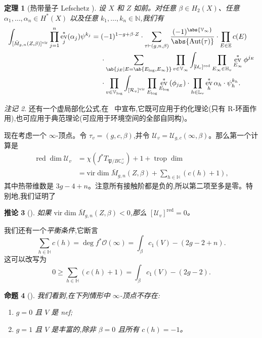 \documentclass{amsart}
\newtheorem{thm}{定理}[section]
\newtheorem{cor}[thm]{推论}
\newtheorem{prop}[thm]{命题}
\theoremstyle{definition}
\theoremstyle{remark}
\newtheorem{rmk}[thm]{注记}
\theoremstyle{plain}
\theoremstyle{definition}
\theoremstyle{remark}
\newcommand{\N}{\mathbb{N}}
\newcommand{\C}{\mathbb{C}}
\newcommand{\E}{\mathbb{E}}
\newcommand{\V}{\mathbb{V}}
\renewcommand{\H}{\mathbb{H}}
\renewcommand{\L}{\mathbb{L}}
\newcommand{\mc}[1]{\mathcal{#1}}
\newcommand{\mf}[1]{\mathfrak{#1}}
\newcommand{\mr}[1]{\mathrm{#1}}
\newcommand{\on}[1]{\operatorname{#1}}
\newcommand{\1}{\mathbf{1}}
\newcommand{\2}{\mathbf{2}}
\newcommand{\3}{\mathbf{3}}
\newcommand{\vir}{\mr{vir}}
\DeclareMathOperator{\Aut}{Aut}
\DeclareMathOperator{\ev}{ev}
\begin{document}
\begin{thm}[热带量子 Lefschetz {\cite{CJRtropical2025}}]
    设 \(X\) 和 \(Z\) 如前。对任意 \(\beta \in H_2(X)\)、任意 \(\alpha_1, \ldots, \alpha_n \in H^*(X)\) 以及任意 \(k_1, \ldots, k_n \in \N\),我们有
    \begin{align*}
        \int_{[\bar{M}_{g,n}(Z,\beta)]^{\vir}} \prod_{j=1}^n \ev_j^* (\alpha_j) \psi^{k_j}={}& (-1)^{1-g+\beta \cdot Z} \cdot \sum_{\tau \vdash (g,n,\beta)} \frac{(-1)^{\abs{\V_{\infty}}}}{\abs{\Aut(\tau)}} \cdot \prod_{E \in \E} c(E) \\
        & \cdot \sum_{\ab\{j_E \mid E = \ab\{E_{\log}, E_{\infty}\}\}}  \prod_{v \in \V_{\infty}} \int_{[\mc{U}_v]^{\on{red}}} \prod_{E_{\infty} \in \H_v} \ev_{E_{\infty}}^* \phi^{j_E}  \\
        &  \cdot \prod_{v \in \V_{\log}} \int_{[\mc{R}_v]^{\vir}} \prod_{E_{\log}} \ev_{E_{\log}}^* (\phi_{j_E}) \cdot \prod_{h \in \L_v} \ev_h^* \alpha_h \cdot \psi_h^{k_h} .
    \end{align*}
\end{thm}

\begin{rmk}
    还有一个虚局部化公式,在~\cite{CJRlocalization} 中宣布,它既可应用于约化理论(只有 R-环面作用),也可应用于典范理论(可应用于环境空间的全部自同构)。
\end{rmk}

现在考虑一个 \(\infty\)-顶点。令 \(\tau_v = (g, c, \beta)\),并令 \(\mc{U}_v = \mc{U}_{g,c}(\infty, \beta)\)。那么第一个计算是
\begin{align*}
    \on{red}\dim \mc{U}_v &= \chi(f^* T_{\mf{P}/B \C^{\times}_{\omega}}) + 1 + \on{trop}\dim  \\
    &= \vir\dim \bar{M}_{g,n}(Z, \beta) + \sum_{h \in \H } (c(h) + 1),
\end{align*}
其中热带维数是 \(3g-4+n\)。注意所有接触阶都是负的,所以第二项至多是零。特别地,我们证明了
\begin{cor}[{\cite{CJRpunctured}}]
    如果 \(\vir\dim \bar{M}_{g,n}(Z,\beta) < 0\),那么 \([\mc{U}_v]^{\on{red}} = 0\)。
\end{cor}
我们还有一个\textit{平衡条件},它断言
\begin{equation}\label{eqn:balancing condition}
    \sum_{h \in \H} c(h) = \deg f^* \mc{O}(\infty) = \int_{\beta} c_1(V) - (2g-2+n).
\end{equation}
这可以改写为
\[ 0 \geq \sum_{h \in \H} (c(h)+1) = \int_{\beta} c_1(V) - (2g-2). \]
\begin{prop}[{\cite{CJRpunctured}}]
    我们看到,在下列情形中 \(\infty\)-顶点不存在:
    \begin{enumerate}
        \item \(g = 0\) 且 \(V\) 是 nef;
        \item \(g=1\) 且 \(V\) 是丰富的,除非 \(\beta = 0\) 且所有 \(c(h) = -1\)。
    \end{enumerate}
\end{prop}
\end{document}
